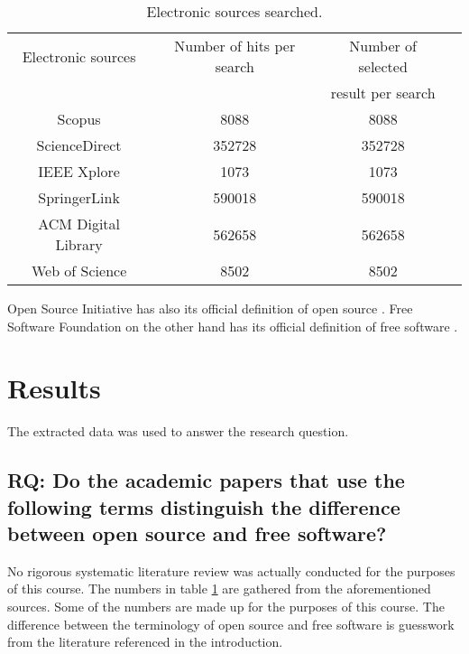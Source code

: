 \documentclass[conference]{IEEEtran}
\begin{document}
\begin{table}[htbp]
	\caption{Electronic sources searched.}
	\begin{center}
		\begin{tabular}{|c|c|c|c|}
			\hline
				Electronic sources & Number of hits per search & Number of selected\\
				&& result per search\\
			\hline
			Scopus & 8088 &  8088\\
			ScienceDirect & 352728 & 352728\\
			IEEE Xplore & 1073 & 1073\\
			SpringerLink & 590018 & 590018\\
			ACM Digital Library & 562658 & 562658\\
			Web of Science & 8502 & 8502\\
			\hline
		\end{tabular}
		\label{tab1}
	\end{center}
\end{table}

Open Source Initiative has also its official definition of open source \cite{osd}. Free Software Foundation on the other hand has its official definition of free software \cite{fsd}.

\section{Results}
The extracted data was used to answer the research question.
\subsection{RQ: Do the academic papers that use the following terms distinguish the difference between open source and free software?}
No rigorous systematic literature review was actually conducted for the purposes of this course. The numbers in table \ref{tab1} are gathered from the aforementioned sources. Some of the numbers are made up for the purposes of this course. The difference between the terminology of open source and free software is guesswork from the literature referenced in the introduction.
\end{document}
